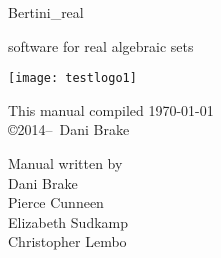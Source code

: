 \documentclass[10pt]{article}
\begin{document}
\pagestyle{plain} 

	\setcounter{page}{1}


\begin{titlepage}

	\begin{center}
	\vspace{2cm}
	{\Large Bertini\_real}

\vspace{\baselineskip}
	{\large software for real algebraic sets}
	
	\vspace{3cm}
	\texttt{[image: testlogo1]}
	\end{center}

	\vfill

	\begin{minipage}{\linewidth}

	\begin{minipage}{0.4\linewidth}
	\centering
	This manual compiled \today \\
	\copyright 2014--\the\year\ Dani Brake
	\end{minipage}
	\hfill
	\begin{minipage}{0.4\linewidth}
	\centering Manual written by \vspace{\baselineskip}
	\\  Dani Brake \\ Pierce Cunneen \\ Elizabeth Sudkamp \\ Christopher Lembo
	\end{minipage}

	\end{minipage}

	

\end{titlepage}




	\tableofcontents
	\eject
	\setcounter{page}{1}
	\eject























\end{document}

